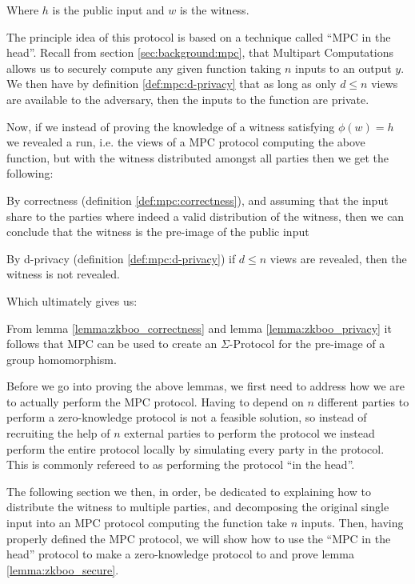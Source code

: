 Where $h$ is the public input and $w$ is the witness.

The principle idea of this protocol is based on a technique called ``MPC in the
head''. Recall from section \ref{sec:background:mpc}, that
Multipart Computations allows us to securely compute any given function taking
$n$ inputs to an output $y$.
We then have by definition \ref{def:mpc:d-privacy} that as long as only
$d \leq n$ views are available to the adversary, then the inputs to the function
are private.

Now, if we instead of proving the knowledge of a witness satisfying $\phi(w) = h$
we revealed a run, i.e. the views of a MPC protocol computing the above
function, but with the witness distributed amongst all parties then we get the
following:

\begin{lemma}
\label{lemma:zkboo_correctness}
By correctness (definition \ref{def:mpc:correctness}), and assuming that
the input share to the parties where indeed a valid distribution of the
witness, then we can conclude that the witness is the pre-image of the public input
\end{lemma}

\begin{lemma}
\label{lemma:zkboo_privacy}
By d-privacy (definition \ref{def:mpc:d-privacy}) if $d \leq n$ views are
revealed, then the witness is not revealed.
\end{lemma}

Which ultimately gives us:

\begin{lemma}
\label{lemma:zkboo_secure}
From lemma \ref{lemma:zkboo_correctness} and lemma \ref{lemma:zkboo_privacy} it
follows that MPC can be used to create an $\Sigma$-Protocol for the
pre-image of a group homomorphism.
\end{lemma}

Before we go into proving the above lemmas, we first need to address how we are
to actually perform the MPC protocol. Having to depend on $n$ different parties
to perform a zero-knowledge protocol is not a feasible solution, so instead of
recruiting the help of $n$ external parties to perform the protocol we instead
perform the entire protocol locally by simulating every party in the protocol.
This is commonly refereed to as performing the protocol ``in the head''.


The following section we then, in order, be dedicated to explaining how to
distribute the witness to multiple parties, and decomposing the original single
input into an MPC protocol computing the function take $n$ inputs. Then, having
properly defined the MPC protocol, we will show how to use the ``MPC in the
head'' protocol to make a zero-knowledge protocol to and prove lemma \ref{lemma:zkboo_secure}.

